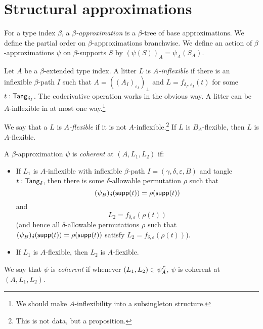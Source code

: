 \section{Structural approximations}
\begin{definition}
  \label{def:StrApprox}
  \leanok
  For a type index \( \beta \), a \emph{\( \beta \)-approximation} is a \( \beta \)-tree of base approximations.
  We define the partial order on \( \beta \)-approximations branchwise.
  We define an action of \( \beta \)-approximations \( \psi \) on \( \beta \)-supports \( S \) by \( (\psi(S))_A = \psi_A(S_A) \).
\end{definition}
\begin{definition}
  \label{def:Inflexible}
  \leanok
  Let \( A \) be a \( \beta \)-extended type index.
  A litter \( L \) is \emph{\( A \)-inflexible} if there is an inflexible \( \beta \)-path \( I \) such that \( A = ((A_I)_{\varepsilon_I})_\bot \) and \( L = f_{\delta_I, \varepsilon_I}(t) \) for some \( t : \mathsf{Tang}_{\delta_I} \).
  The coderivative operation works in the obvious way.
  A litter can be \( A \)-inflexible in at most one way.\footnote{We should make \( A \)-inflexibility into a subsingleton structure.}

  We say that a \( L \) is \emph{\( A \)-flexible} if it is not \( A \)-inflexible.\footnote{This is not data, but a proposition.}
  If \( L \) is \( B_A \)-flexible, then \( L \) is \( A \)-flexible.
\end{definition}
\begin{definition}
  \label{def:StrApprox.Coherent}
  \leanok
  A \( \beta \)-approximation \( \psi \) is \emph{coherent} at \( (A, L_1, L_2) \) if:
  \begin{itemize}
    \item If \( L_1 \) is \( A \)-inflexible with inflexible \( \beta \)-path \( I = (\gamma, \delta, \varepsilon, B) \) and tangle \( t : \mathsf{Tang}_\delta \), then there is some \( \delta \)-allowable permutation \( \rho \) such that
    \[ (\psi_B)_\delta(\operatorname{\mathsf{supp}}(t)) = \rho(\operatorname{\mathsf{supp}}(t)) \]
    and
    \[ L_2 = f_{\delta,\varepsilon}(\rho(t)) \]
    (and hence all \( \delta \)-allowable permutations \( \rho \) such that \( (\psi_B)_\delta(\operatorname{\mathsf{supp}}(t)) = \rho(\operatorname{\mathsf{supp}}(t)) \) satisfy \( L_2 = f_{\delta,\varepsilon}(\rho(t)) \)).
    \item If \( L_1 \) is \( A \)-flexible, then \( L_2 \) is \( A \)-flexible.
  \end{itemize}
  We say that \( \psi \) is \emph{coherent} if whenever \( (L_1, L_2) \in \psi_A^{\mathcal L} \), \( \psi \) is coherent at \( (A, L_1, L_2) \).
\end{definition}
